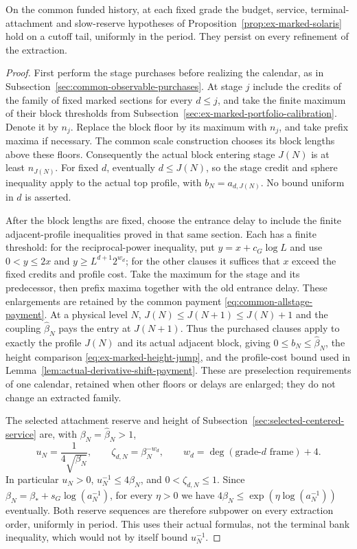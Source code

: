 \begin{lemma}
\label{lem:c14-selected-calibration-payments}
On the common funded history, at each fixed grade the budget, service,
terminal-attachment and slow-reserve hypotheses of
Proposition~\ref{prop:ex-marked-solaris} hold on a cutoff tail, uniformly
in the period. They persist on every refinement of the extraction.
\end{lemma}
\begin{proof}
First perform the stage purchases before realizing the calendar, as in
Subsection~\ref{sec:common-observable-purchases}. At stage $j$ include the
credits of the family of fixed marked sections for every $d\le j$, and take the finite
maximum of their block thresholds from
Subsection~\ref{sec:ex-marked-portfolio-calibration}. Denote it by $n_j$.
Replace the block floor by its maximum with $n_j$, and take prefix maxima
if necessary. The common scale construction chooses its block lengths
above these floors. Consequently the actual block entering stage $J(N)$
is at least $n_{J(N)}$. For fixed $d$, eventually $d\le J(N)$, so the
stage credit and sphere inequality apply to the actual top profile,
with $b_N=a_{d,J(N)}$. No bound uniform in $d$ is asserted.

After the block lengths are fixed, choose the entrance delay to include
the finite adjacent-profile inequalities proved in that same section.
Each has a finite threshold: for the reciprocal-power inequality, put
$y=x+c_G\log L$ and use $0<y\le2x$ and
$y\ge L^{d+1}2^{w_d}$; for the other clauses it suffices that $x$
exceed the fixed credits and profile cost. Take the maximum for the
stage and its predecessor, then prefix maxima together with the old
entrance delay. These enlargements are retained by the common payment
\eqref{eq:common-allstage-payment}. At a physical level $N$,
$J(N)\le J(N+1)\le J(N)+1$ and the coupling $\widehat\beta_N$
pays the entry at $J(N+1)$. Thus the purchased clauses apply to exactly
the profile $J(N)$ and its actual adjacent block, giving
$0\le b_N\le\widehat\beta_N$, the height comparison
\eqref{eq:ex-marked-height-jump}, and the profile-cost bound used in
Lemma~\ref{lem:actual-derivative-shift-payment}. These are preselection
requirements of one calendar, retained when other floors or delays are
enlarged; they do not change an extracted family.

The selected attachment reserve and height of
Subsection~\ref{sec:selected-centered-service} are, with
$\beta_N=\widehat\beta_N>1$,
\[
 u_N=\frac1{4\sqrt{\beta_N}},\qquad
 \zeta_{d,N}=\beta_N^{-w_d},\qquad w_d=\deg(\text{grade-$d$ frame})+4.
\]
In particular $u_N>0$, $u_N^{-1}\le4\beta_N$, and
$0<\zeta_{d,N}\le1$. Since
$\beta_N=\beta_*+s_G\log(a_N^{-1})$, for every $\eta>0$
we have $4\beta_N\le\exp(\eta\log(a_N^{-1}))$ eventually.
Both reserve sequences are therefore subpower on every extraction
order, uniformly in period. This uses their actual formulas, not the
terminal bank inequality, which would not by itself bound $u_N^{-1}$.


\end{proof}
